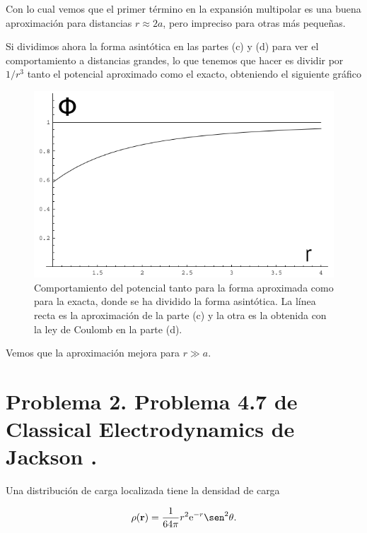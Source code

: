 \documentclass[a4paper,11pt]{article}
\numberwithin{equation}{section}
\newcommand{\euler}{\mathrm{e}}
\begin{document}
Con lo cual vemos que el primer término en la expansión multipolar es una buena 
aproximación para distancias $r \approx 2a$, pero impreciso para otras más pequeñas.

\vspace{.3cm}

Si dividimos ahora la forma asintótica en las partes (c) y (d) para ver el comportamiento 
a distancias grandes, lo que tenemos que hacer es dividir por $1/r^3$ tanto 
el potencial aproximado como el exacto, obteniendo el siguiente gráfico

\begin{figure}[H]
\center 
\includegraphics[scale=0.6]{problema1fig4}
\caption{Comportamiento del potencial tanto para la forma aproximada como para 
la exacta, donde se ha dividido la forma asintótica. La línea recta es la aproximación 
de la parte (c) y la otra es la obtenida con la ley de Coulomb en la parte (d).}
\end{figure}

Vemos que la aproximación mejora para $r \gg a$. 

\newpage

\section{Problema 2. Problema 4.7 de Classical Electrodynamics
de Jackson \cite{jackson}.}

Una distribución de carga localizada tiene la densidad de carga 

$$
\rho(\mathbf{r}) = \frac{1}{64\pi}r^2\euler^{-r}\sen^2{\theta}.
$$
\end{document}
